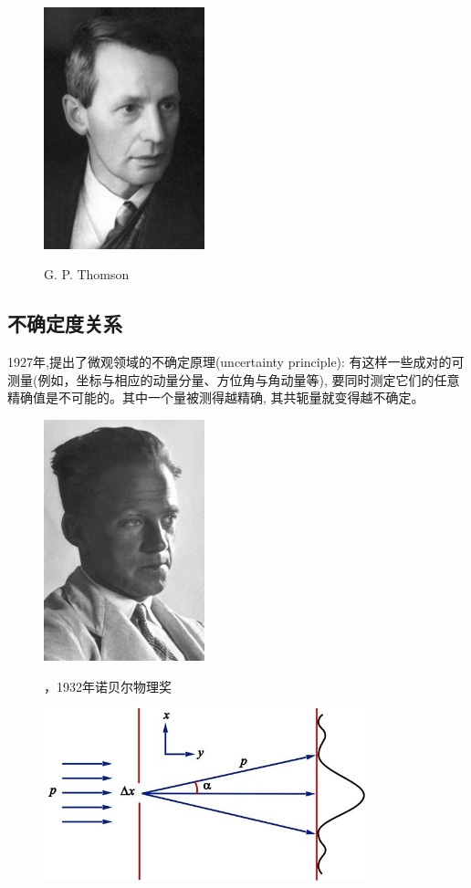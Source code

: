 \begin{figure}[!ht]
\centering
\includegraphics[height=7cm]{pic/thomson.jpg}\\
\caption{G. P. Thomson}
\end{figure}


\subsection{不确定度关系}
\begin{statT}[不确定原理]
1927年,\heisenberg 提出了微观领域的不确定原理(uncertainty principle):
有这样一些成对的可测量(例如，坐标与相应的动量分量、方位角与角动量等), 要同时测定它们的任意精确值是不可能的。其中一个量被测得越精确, 其共轭量就变得越不确定。 
\end{statT}

\begin{figure}[!ht]
\centering
\includegraphics[height=7cm]{pic/heisenberg.jpg}\\
\caption{\heisenberg，1932年诺贝尔物理奖}
\end{figure}

\begin{figure}[!ht]
\centering
\includegraphics[height=5cm]{pic/diffraction.jpg}
\end{figure}

